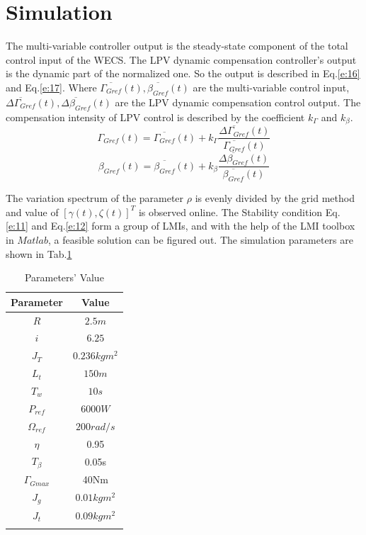 \documentclass[english]{cccconf}
\begin{document}
\section{Simulation}

The multi-variable controller output is the steady-state component of the
total control input of the WECS. The LPV dynamic compensation controller's
output is the dynamic part of the normalized one. So the output is described
in Eq.\ref{e:16} and Eq.\ref{e:17}. Where $\overline{\Gamma_{Gref}}(t),
\overline{\beta_{Gref}}(t)$ are the multi-variable control input,
$\overline{\Delta\Gamma_{Gref}}(t), \overline{\Delta\beta_{Gref}}(t)$ are
the LPV dynamic compensation control output. The compensation intensity
of LPV control is described by the coefficient $k_{\Gamma}$ and $k_\beta$.
\begin{equation}\label{e:16}
  \Gamma_{Gref}(t)  = \overline{\Gamma_{Gref}}(t) +
                    k_\Gamma\dfrac{\overline{\Delta\Gamma_{Gref}}(t)}
                    {\overline{\Gamma_{Gref}}(t)}
\end{equation}
\begin{equation}\label{e:17}
  \beta_{Gref}(t)  = \overline{\beta_{Gref}}(t) + k_\beta\dfrac
        {\overline{\Delta\beta_{Gref}}(t)}{\overline{\beta_{Gref}}(t)}
\end{equation}

The variation spectrum of the parameter $\rho$ is evenly divided by the
grid method and value of $[\gamma(t), \zeta(t)]^T$ is observed online.
The Stability condition Eq.\ref{e:11} and Eq.\ref{e:12} form a group of
LMIs, and with the help of the LMI toolbox in $Matlab$, a feasible solution
can be figured out. The simulation parameters are shown in Tab.\ref{tab1}
\begin{table}[!htb]
  \centering
  \caption{Parameters' Value}
  \label{tab1}
  \begin{tabular}{c|c}
    \hhline
    Parameter     &     Value   \\ \hline
    $R$           &     $2.5m$  \\ \hline
    $i$           &     $6.25$  \\ \hline
    $J_T$         &     $0.236kgm^2$    \\ \hline
    $L_t$         &     $150m$  \\ \hline
    $T_w$         &     $10s$   \\ \hline
    $P_{ref}$     &     $6000W$ \\ \hline
    $\Omega_{ref}$  &   $200rad/s$  \\  \hline
    $\eta$      &   0.95    \\  \hline
    $T_\beta$   &   0.05s   \\  \hline
    $\Gamma_{Gmax}$ &   40Nm    \\  \hline
    $J_g$       &   $0.01kgm^2$ \\  \hline
    $J_t$       &   $0.09kgm^2$ \\
    \hhline
  \end{tabular}
\end{table}
\end{document}
